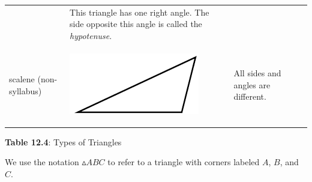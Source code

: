 \begin{center}
\begin{xtabular*}{\mytablewidth}[t]{|p{10\mystarwidth}|p{10\mystarwidth}|p{10\mystarwidth}|}
\begin{center}
      \vspace{2pt}
    \vspace{.1in}
    \end{center}    
                 &
        This triangle has one right angle. The side opposite this angle is called the \textsl{hypotenuse}.%
     \tabularnewline{}
        scalene (non-syllabus) &
    \setcounter{subfigure}{0}
\label{m39368*id317668}
    \begin{center}
    \label{m39368*id317668!!!underscore!!!media}\label{m39368*id317668!!!underscore!!!printimage}\includegraphics[width=.2\columnwidth]{col11306.imgs/m39368_MG10C13_026.png} %
      \vspace{2pt}
    \vspace{.1in}
    \end{center}    
                 &
        All sides and angles are different.%
     \tabularnewline{}
    \end{xtabular*}
      \end{center}
    \begin{center}{\small\bfseries Table 12.4}: Types of Triangles\end{center}
    \par
        \label{m39368*id317683}We use the notation \begin{math}▵ABC\end{math} to refer to a triangle with corners labeled \begin{math}A\end{math}, \begin{math}B\end{math}, and \begin{math}C\end{math}.\par 
        \label{m39368*uid40}

